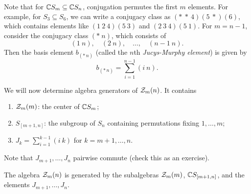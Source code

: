 \begin{example}
  Note that for $\mathbb{C} S_m \subseteq \mathbb{C} S_n$,
  conjugation permutes the first $m$
  elements. For example, for
  $S_3 \subseteq S_6$, we can
  write a conjugacy class as
  $({*}\ {*}\ 4)(5\ {*})(6)$, which
  contains elements like
  $(1\ 2\ 4)(5\ 3)$ and
  $(2\ 3\ 4)(5\ 1)$.
  For $m = n - 1$, consider the conjugacy
  class $({*}\ n)$, which consists of
  \[
    (1\ n), \quad (2\ n), \quad \ldots, \quad (n - 1\ n).
  \]
  Then the basis element $b_{({*}\, n)}$
  (called the $n$th \emph{Jucys-Murphy element}) is given by
  \[
    b_{({*}\, n)} = \sum_{i = 1}^{n - 1} (i\ n).
  \]
\end{example}

\begin{remark}
  We will now determine
  algebra generators of
  $\mathcal{Z}_m(n)$. It contains
  \begin{enumerate}
    \item $\mathcal{Z}_m(m)$: the center of
      $\mathbb{C} S_m$;
    \item $S_{[m + 1, n]}$: the subgroup
      of $S_n$ containing permutations
      fixing $1, \dots, m$;
    \item $J_k = \sum_{i = 1}^{k - 1} (i\ k)$
      for $k = m + 1, \dots, n$.
  \end{enumerate}
  Note that $J_{m + 1}, \dots, J_n$
  pairwise commute (check this as
  an exercise).
\end{remark}

\begin{theorem}
  The algebra $\mathcal{Z}_m(n)$ is generated by
  the subalgebras $\mathcal{Z}_m(m)$,
  $\mathbb{C} S_{[m + 1, n]}$, and the elements
  $J_{m + 1}, \dots, J_n$.
\end{theorem}
